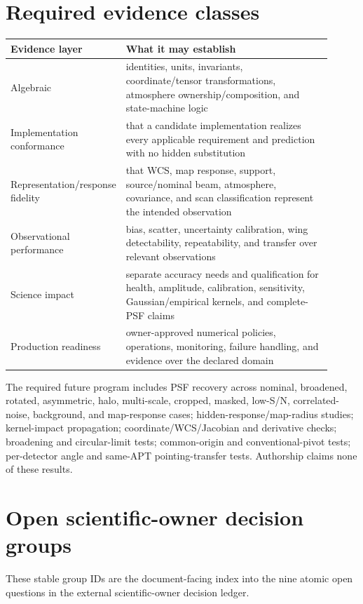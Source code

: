 \documentclass[10pt]{article}
\begin{document}
\section{Required evidence classes}
\small

\begin{longtable}{L{0.22\linewidth}L{0.69\linewidth}}
\toprule Evidence layer & What it may establish \\
\midrule
Algebraic & identities, units, invariants, coordinate/tensor transformations, atmosphere ownership/composition, and state-machine logic \\
Implementation conformance & that a candidate implementation realizes every applicable requirement and prediction with no hidden substitution \\
Representation/response fidelity & that WCS, map response, support, source/nominal beam, atmosphere, covariance, and scan classification represent the intended observation \\
Observational performance & bias, scatter, uncertainty calibration, wing detectability, repeatability, and transfer over relevant observations \\
Science impact & separate accuracy needs and qualification for health, amplitude, calibration, sensitivity, Gaussian/empirical kernels, and complete-PSF claims \\
Production readiness & owner-approved numerical policies, operations, monitoring, failure handling, and evidence over the declared domain \\
\bottomrule
\end{longtable}

The required future program includes PSF recovery across nominal, broadened,
rotated, asymmetric, halo, multi-scale, cropped, masked, low-S/N, correlated-
noise, background, and map-response cases; hidden-response/map-radius studies;
kernel-impact propagation; coordinate/WCS/Jacobian and derivative checks;
broadening and circular-limit tests; common-origin and conventional-pivot
tests; per-detector angle and same-APT pointing-transfer tests. Authorship
claims none of these results.
\normalsize

\section{Open scientific-owner decision groups}

These stable group IDs are the document-facing index into the nine atomic open
questions in the external scientific-owner decision ledger.
\end{document}
